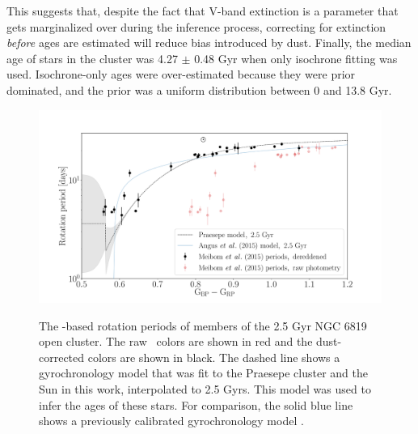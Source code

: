 This suggests that, despite the fact that V-band extinction is a parameter
that gets marginalized over during the inference process, correcting for
extinction {\it before} ages are estimated will reduce bias introduced by
dust.
Finally, the median age of stars in the cluster was 4.27 $\pm$ 0.48 Gyr when
only isochrone fitting was used.
Isochrone-only ages were over-estimated because they were prior dominated, and
the prior was a uniform distribution between 0 and 13.8 Gyr.
\begin{figure}
  \caption{
    The \kepler-based rotation periods of members of the 2.5 Gyr NGC 6819 open
    cluster.
    The raw \gcolor\ colors are shown in red and the dust-corrected colors are
    shown in black.
    The dashed line shows a gyrochronology model that was fit to the Praesepe
    cluster and the Sun in this work, interpolated to 2.5 Gyrs.
    This model was used to infer the ages of these stars.
    For comparison, the solid blue line shows a previously calibrated
    gyrochronology model \citep{angus2015}.
}
  \centering
    \includegraphics[width=1\textwidth]{NGC6819}
\label{fig:NGC6819}
\end{figure}
